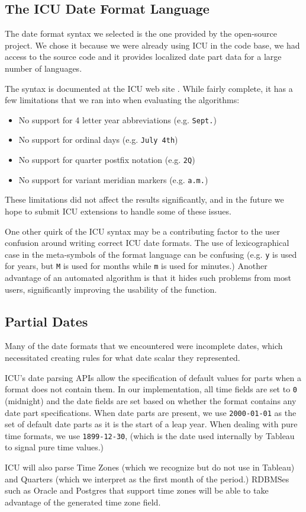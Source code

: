 \subsection{The ICU Date Format Language}
The date format syntax we selected is the one provided by the open-source project. We chose it because we were already using ICU in the code base, we had access to the source code and it provides localized date part data for a large number of languages.

The syntax is documented at the ICU web site \cite{icu}. While fairly complete, it has a few limitations that we ran into when evaluating the algorithms:
\begin{itemize}
\item No support for 4 letter year abbreviations (e.g. \texttt{Sept.})
\item No support for ordinal days (e.g. \texttt{July 4th})
\item No support for quarter postfix notation (e.g. \texttt{2Q})
\item No support for variant meridian markers (e.g. \texttt{a.m.})
\end{itemize}

These limitations did not affect the results significantly, and in the future we hope to submit ICU extensions to handle some of these issues.

One other quirk of the ICU syntax may be a contributing factor to the user confusion around writing correct ICU date formats. The use of lexicographical case in the meta-symbols of the format language can be confusing (e.g. \texttt{y} is used for years, but \texttt{M} is used for months while \texttt{m} is used for minutes.) Another advantage of an automated algorithm is that it hides such problems from most users, significantly improving the usability of the function.

\subsection{Partial Dates}
Many of the date formats that we encountered were incomplete dates, which necessitated creating rules for what date scalar they represented.

ICU's date parsing APIs allow the specification of default values for parts when a format does not contain them. In our implementation, all time fields are set to \texttt{0} (midnight) and the date fields are set based on whether the format contains any date part specifications. When date parts are present, we use \texttt{2000-01-01} as the set of default date parts as it is the start of a leap year. When dealing with pure time formats, we use \texttt{1899-12-30}, (which is the date used internally by Tableau to signal pure time values.)

ICU will also parse Time Zones (which we recognize but do not use in Tableau) and Quarters (which we interpret as the first month of the period.) RDBMSes such as Oracle and Postgres that support time zones will be able to take advantage of the generated time zone field.
